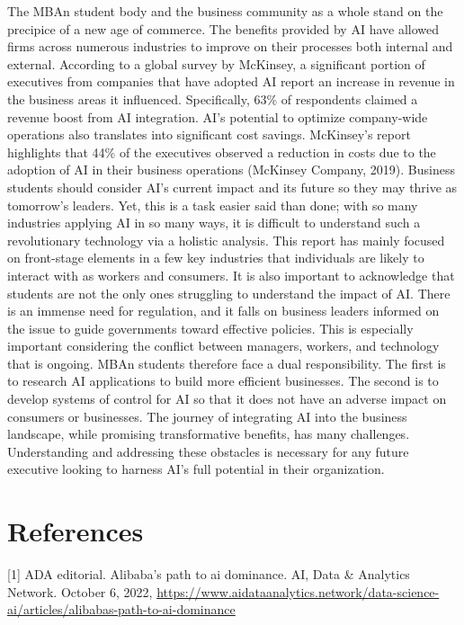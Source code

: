 \documentclass[
]{book}
\begin{document}
The MBAn student body and the business community as a whole stand on the precipice of a new age of commerce. The benefits provided by AI have allowed firms across numerous industries to improve on their processes both internal and external. According to a global survey by McKinsey, a significant portion of executives from companies that have adopted AI report an increase in revenue in the business areas it influenced. Specifically, 63\% of respondents claimed a revenue boost from AI integration. AI's potential to optimize company-wide operations also translates into significant cost savings. McKinsey's report highlights that 44\% of the executives observed a reduction in costs due to the adoption of AI in their business operations (McKinsey Company, 2019). Business students should consider AI's current impact and its future so they may thrive as tomorrow's leaders. Yet, this is a task easier said than done; with so many industries applying AI in so many ways, it is difficult to understand such a revolutionary technology via a holistic analysis. This report has mainly focused on front-stage elements in a few key industries that individuals are likely to interact with as workers and consumers. It is also important to acknowledge that students are not the only ones struggling to understand the impact of AI. There is an immense need for regulation, and it falls on business leaders informed on the issue to guide governments toward effective policies. This is especially important considering the conflict between managers, workers, and technology that is ongoing. MBAn students therefore face a dual responsibility. The first is to research AI applications to build more efficient businesses. The second is to develop systems of control for AI so that it does not have an adverse impact on consumers or businesses. The journey of integrating AI into the business landscape, while promising transformative benefits, has many challenges. Understanding and addressing these obstacles is necessary for any future executive looking to harness AI's full potential in their organization.

\hypertarget{references}{%
\chapter{References}\label{references}}

{[}1{]} ADA editorial. Alibaba's path to ai dominance. AI, Data \& Analytics Network. October 6, 2022, \url{https://www.aidataanalytics.network/data-science-ai/articles/alibabas-path-to-ai-dominance}
\end{document}
